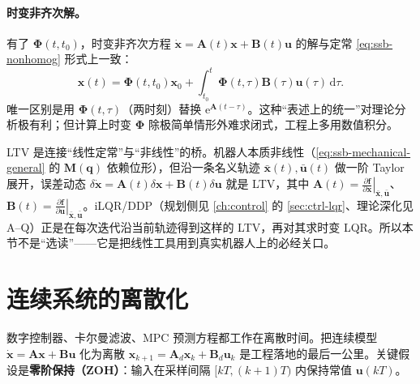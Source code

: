 \paragraph{时变非齐次解。}
有了 $\boldsymbol{\Phi}(t,t_0)$，时变非齐次方程 $\dot{\mathbf{x}}=\mathbf{A}(t)\mathbf{x}+\mathbf{B}(t)\mathbf{u}$ 的解与定常 \cref{eq:ssb-nonhomog} 形式上一致\cite{zhang2017modern}：
\begin{equation}
  \mathbf{x}(t)=\boldsymbol{\Phi}(t,t_0)\mathbf{x}_0+\int_{t_0}^t\boldsymbol{\Phi}(t,\tau)\mathbf{B}(\tau)\mathbf{u}(\tau)\,\mathrm{d}\tau.
  \label{eq:ssb-ltv-nonhomog}
\end{equation}
唯一区别是用 $\boldsymbol{\Phi}(t,\tau)$（两时刻）替换 $\mathrm{e}^{\mathbf{A}(t-\tau)}$。这种“表述上的统一”对理论分析极有利；但计算上时变 $\boldsymbol{\Phi}$ 除极简单情形外难求闭式，工程上多用数值积分。

\begin{insight}
LTV 是连接“线性定常”与“非线性”的桥。机器人本质非线性（\cref{eq:ssb-mechanical-general} 的 $\mathbf{M}(\mathbf{q})$ 依赖位形），但沿一条名义轨迹 $\bar{\mathbf{x}}(t),\bar{\mathbf{u}}(t)$ 做一阶 Taylor 展开，误差动态 $\delta\dot{\mathbf{x}}=\mathbf{A}(t)\delta\mathbf{x}+\mathbf{B}(t)\delta\mathbf{u}$ 就是 LTV，其中 $\mathbf{A}(t)=\left.\tfrac{\partial\mathbf{f}}{\partial\mathbf{x}}\right|_{\bar{\mathbf{x}},\bar{\mathbf{u}}}$、$\mathbf{B}(t)=\left.\tfrac{\partial\mathbf{f}}{\partial\mathbf{u}}\right|_{\bar{\mathbf{x}},\bar{\mathbf{u}}}$。iLQR/DDP（规划侧见 \cref{ch:control} 的 \cref{sec:ctrl-lqr}、理论深化见 A--Q）正是在每次迭代沿当前轨迹得到这样的 LTV，再对其求时变 LQR。所以本节不是“选读”——它是把线性工具用到真实机器人上的必经关口。
\end{insight}

\section{连续系统的离散化}
\label{sec:ssb-discretize}

数字控制器、卡尔曼滤波、MPC 预测方程都工作在离散时间。把连续模型 $\dot{\mathbf{x}}=\mathbf{A}\mathbf{x}+\mathbf{B}\mathbf{u}$ 化为离散 $\mathbf{x}_{k+1}=\mathbf{A}_d\mathbf{x}_k+\mathbf{B}_d\mathbf{u}_k$ 是工程落地的最后一公里。关键假设是\textbf{零阶保持（ZOH）}：输入在采样间隔 $[kT,(k+1)T)$ 内保持常值 $\mathbf{u}(kT)$。

